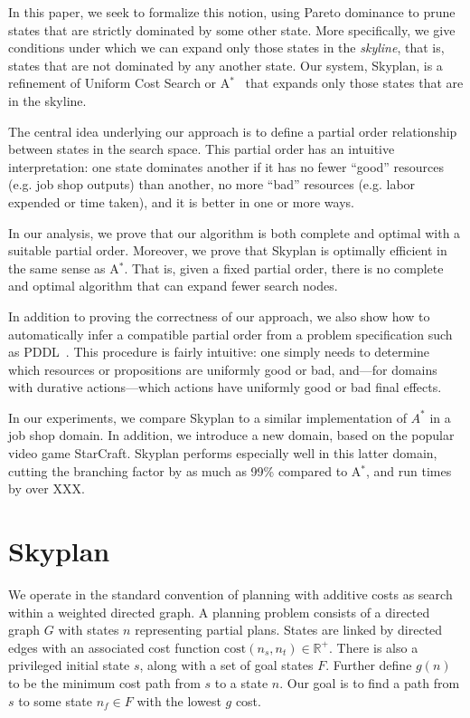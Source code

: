 \documentclass[letterpaper]{article}
\theoremstyle{plain} \newtheorem{theorem}{Theorem} \newtheorem{proposition}{Proposition} \newtheorem{lemma}{Lemma}
\theoremstyle{definition} \newtheorem{definition}{Definition} \newtheorem{conjecture}{Conjecture} \newtheorem*{example}{Example}
\theoremstyle{remark} \newtheorem*{remark}{Remark} \newtheorem*{note}{Note} \newtheorem{case}{Case}
\newcommand{\Astar}{A$^*$}
\begin{document}
In this paper, we seek to formalize this notion, using Pareto
dominance to prune states that are strictly dominated by some other
state. More specifically, we give conditions under which we can
expand only those states in the \textit{skyline}, that is, states
that are not dominated by any another state. Our system, Skyplan,
is a refinement of Uniform Cost Search or \Astar~\citep{astar} that
expands only those states that are in the skyline.

The central idea underlying our approach is to define a partial
order relationship between states in the search space. This partial
order has an intuitive interpretation: one state dominates another
if it has no fewer ``good'' resources (e.g. job shop outputs) than
another, no more ``bad'' resources (e.g. labor expended or time
taken), and it is better in one or more ways. 

In our analysis, we prove that our algorithm is both complete and
optimal with a suitable partial order. Moreover, we prove that
Skyplan is optimally efficient in the same sense as \Astar. That
is, given a fixed partial order, there is no complete and optimal
algorithm that can expand fewer search nodes.

In addition to proving the correctness of our approach, we also
show how to automatically infer a compatible partial order from a problem
specification such as PDDL~\citep{ghallab1998pddl,fox2003pddl2}.
This procedure is fairly intuitive: one simply needs to determine
which resources or propositions are uniformly good or bad, and---for 
domains with durative actions---which actions have uniformly
good or bad final effects.

In our experiments, we compare Skyplan to a similar implementation
of $A^*$ in a job shop domain. In addition, we introduce a new
domain, based on the popular video game StarCraft. Skyplan performs
especially well in this latter domain, cutting the branching factor
by as much as 99\% compared to \Astar, and run times by over XXX.

\section{Skyplan}


We operate in the standard convention of planning with additive
costs as search within a weighted directed graph.  A planning problem
consists of a directed graph $G$ with states $n$ representing
partial plans. States are linked by directed edges with an associated
cost function $\mathrm{cost}(n_s,n_t) \in \mathbb R^+$.  There is
also a privileged initial state $s$, along with a set of goal states
$F$.  Further define $g(n)$ to be the minimum cost path from $s$
to a state $n$.  Our goal is to find a path from $s$ to some state
$n_f \in F$ with the lowest $g$ cost.
\end{document}
